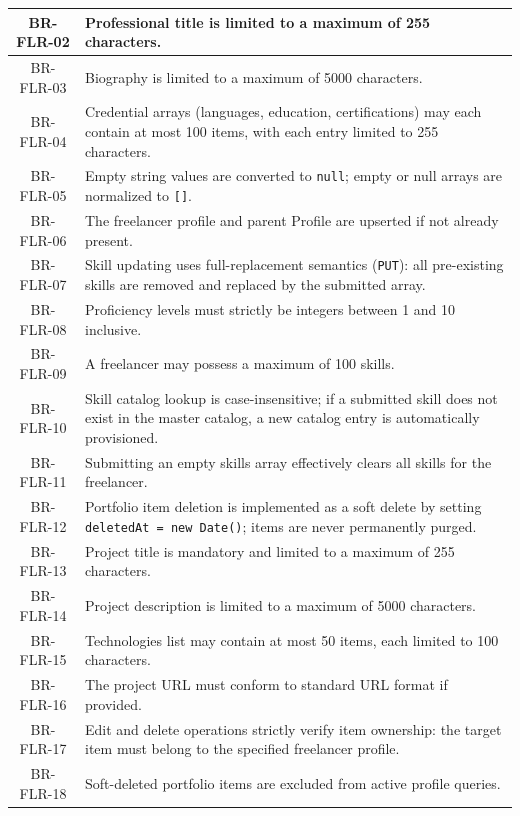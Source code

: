 \begin{longtable}{|c|p{12cm}|}
    BR-FLR-02 & Professional title is limited to a maximum of 255 characters. \\ \hline
    BR-FLR-03 & Biography is limited to a maximum of 5000 characters. \\ \hline
    BR-FLR-04 & Credential arrays (languages, education, certifications) may each contain at most 100 items, with each entry limited to 255 characters. \\ \hline
    BR-FLR-05 & Empty string values are converted to \texttt{null}; empty or null arrays are normalized to \texttt{[]}. \\ \hline
    BR-FLR-06 & The freelancer profile and parent Profile are upserted if not already present. \\ \hline
    BR-FLR-07 & Skill updating uses full-replacement semantics (\texttt{PUT}): all pre-existing skills are removed and replaced by the submitted array. \\ \hline
    BR-FLR-08 & Proficiency levels must strictly be integers between 1 and 10 inclusive. \\ \hline
    BR-FLR-09 & A freelancer may possess a maximum of 100 skills. \\ \hline
    BR-FLR-10 & Skill catalog lookup is case-insensitive; if a submitted skill does not exist in the master catalog, a new catalog entry is automatically provisioned. \\ \hline
    BR-FLR-11 & Submitting an empty skills array effectively clears all skills for the freelancer. \\ \hline
    BR-FLR-12 & Portfolio item deletion is implemented as a soft delete by setting \texttt{deletedAt = new Date()}; items are never permanently purged. \\ \hline
    BR-FLR-13 & Project title is mandatory and limited to a maximum of 255 characters. \\ \hline
    BR-FLR-14 & Project description is limited to a maximum of 5000 characters. \\ \hline
    BR-FLR-15 & Technologies list may contain at most 50 items, each limited to 100 characters. \\ \hline
    BR-FLR-16 & The project URL must conform to standard URL format if provided. \\ \hline
    BR-FLR-17 & Edit and delete operations strictly verify item ownership: the target item must belong to the specified freelancer profile. \\ \hline
    BR-FLR-18 & Soft-deleted portfolio items are excluded from active profile queries. \\ \hline

\end{longtable}
